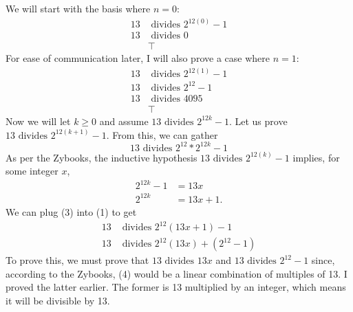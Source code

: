 \documentclass{article}
\begin{document}
\section{}
We will start with the basis where $n=0$:
\begin{align*}
    13 & \text{ divides } 2^{12(0)}-1 \\
    13 & \text{ divides } 0 \\
    & \top
\end{align*}
For ease of communication later, I will also prove a case where $n=1$:
\begin{align*}
    13 & \text{ divides } 2^{12(1)}-1 \\
    13 & \text{ divides } 2^{12}-1 \\
    13 & \text{ divides } 4095 \\
    & \top
\end{align*}
Now we will let $k \geq 0$ and assume $13 \text{ divides } 2^{12k}-1$. Let us prove $13 \text{ divides } 2^{12(k+1)}-1$. From this, we can gather
\begin{equation}
    13 \text{ divides } 2^{12} * 2^{12k} - 1
\end{equation}
As per the Zybooks, the inductive hypothesis $13 \text{ divides } 2^{12(k)}-1$ implies, for some integer $x$,
\begin{align}
    2^{12k} - 1 &= 13x \\
    2^{12k} &= 13x + 1.
\end{align}
We can plug (3) into (1) to get
\begin{align*}
    13 &\text{ divides } 2^{12}(13x + 1) - 1 \\
    13 &\text{ divides } 2^{12}(13x) + (2^{12} - 1) \tag*{(4)}
\end{align*}
To prove this, we must prove that $13 \text{ divides } 13x$ and $13 \text{ divides } 2^{12} - 1$ since, according to the Zybooks, (4) would be a linear combination of multiples of 13. I proved the latter earlier. The former is 13 multiplied by an integer, which means it will be divisible by 13. \rightline{$\blacksquare$}
\end{document}
